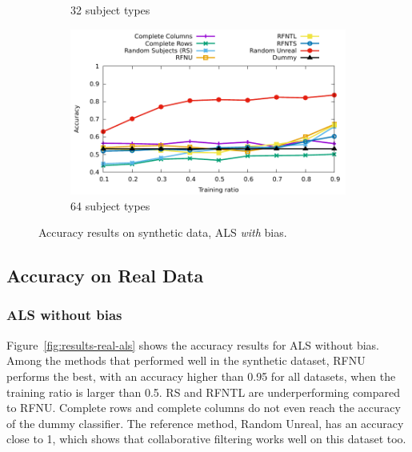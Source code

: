 \documentclass[10pt, conference, compsocconf]{IEEEtran}
\begin{document}
\begin{figure}
\begin{subfigure}[b]{\columnwidth}
        \caption{32 subject types}
\end{subfigure}
\hfill
\begin{subfigure}[b]{\columnwidth}
        \includegraphics[width=0.8\columnwidth]{data/results/means_of_results/ALS-Bias/Synthetic/synthetic_subject_types/ALS-Bias-64-types.pdf}
        \caption{64 subject types}
\end{subfigure}
\caption{Accuracy results on synthetic data, ALS \emph{with} bias.}
\label{fig:results-synthetic-als-bias}
\end{figure}

\subsection{Accuracy on  Real Data}

\subsubsection{ALS without bias}

Figure~\ref{fig:results-real-als} shows the accuracy results for ALS without bias. Among the methods that performed 
well in the synthetic dataset, RFNU performs the best, with an accuracy 
higher than 0.95 for all datasets, when the training ratio is larger 
than 0.5. RS and RFNTL are underperforming compared to RFNU. 
Complete rows and complete columns do not even reach the accuracy of 
the dummy classifier. The reference method, Random Unreal, has an 
accuracy close to 1, which shows that collaborative filtering works 
well on this dataset too.
\end{document}
